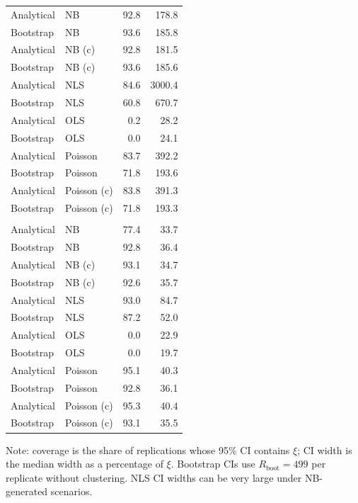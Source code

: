 \begin{table}[ht!]
\begin{tabular*}{\linewidth}{@{\extracolsep{\fill}}llrr}
\midrule\addlinespace[2.5pt]
Analytical & NB & 92.8 & 178.8 \\ 
Bootstrap & NB & 93.6 & 185.8 \\ 
Analytical & NB (c) & 92.8 & 181.5 \\ 
Bootstrap & NB (c) & 93.6 & 185.6 \\ 
Analytical & NLS & 84.6 & 3000.4 \\ 
Bootstrap & NLS & 60.8 & 670.7 \\ 
Analytical & OLS & 0.2 & 28.2 \\ 
Bootstrap & OLS & 0.0 & 24.1 \\ 
Analytical & Poisson & 83.7 & 392.2 \\ 
Bootstrap & Poisson & 71.8 & 193.6 \\ 
Analytical & Poisson (c) & 83.8 & 391.3 \\ 
Bootstrap & Poisson (c) & 71.8 & 193.3 \\ 
\midrule\addlinespace[2.5pt]
\multicolumn{4}{l}{Po($n$)-Po($m$)} \\[2.5pt] 
\midrule\addlinespace[2.5pt]
Analytical & NB & 77.4 & 33.7 \\ 
Bootstrap & NB & 92.8 & 36.4 \\ 
Analytical & NB (c) & 93.1 & 34.7 \\ 
Bootstrap & NB (c) & 92.6 & 35.7 \\ 
Analytical & NLS & 93.0 & 84.7 \\ 
Bootstrap & NLS & 87.2 & 52.0 \\ 
Analytical & OLS & 0.0 & 22.9 \\ 
Bootstrap & OLS & 0.0 & 19.7 \\ 
Analytical & Poisson & 95.1 & 40.3 \\ 
Bootstrap & Poisson & 92.8 & 36.1 \\ 
Analytical & Poisson (c) & 95.3 & 40.4 \\ 
Bootstrap & Poisson (c) & 93.1 & 35.5 \\ 
\bottomrule
\end{tabular*}
\begin{minipage}{\linewidth}
\vspace{.05em}
Note: coverage is the share of replications whose 95\% CI contains $\xi$; CI width is the median width as a percentage of $\xi$. Bootstrap CIs use $R_{\text{boot}} = 499$ per replicate without clustering. NLS CI widths can be very large under NB-generated scenarios.\\
\end{minipage}
\end{table}



